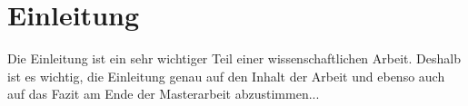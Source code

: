 \chapter{Einleitung}
\label{kap:einleitung}

Die Einleitung ist ein sehr wichtiger Teil einer wissenschaftlichen Arbeit. Deshalb ist es wichtig, die Einleitung genau auf den Inhalt der Arbeit und ebenso auch auf das Fazit am Ende der Masterarbeit abzustimmen...
